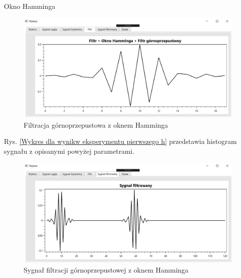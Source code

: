 \documentclass[12pt]{article}
\begin{document}
\newpage
Okno Hamminga
\begin{figure}[h!]
 \centering
 \includegraphics[width=12.3cm]{prostFGOHm.PNG}
 \vspace{-0.3cm}
 \caption{Filtracja górnoprzepustowa z oknem Hamminga}
 \label{Wykres dla wyników eksperymentu drugiego}
\end{figure}
\newpage
Rys. \ref{Wykres dla wynikw eksperymentu pierwszego h} przedstawia histogram sygnału z opisanymi powyżej parametrami. 
\begin{figure}[h!]
 \centering
 \includegraphics[width=12.3cm]{prostSFGHm.PNG}
 \vspace{-0.3cm}
 \caption{Sygnał filtracji górnoprzepustowej z oknem Hamminga}
 \label{Histogram dla wyników eksperymentu drugiego}
\end{figure}
\end{document}
